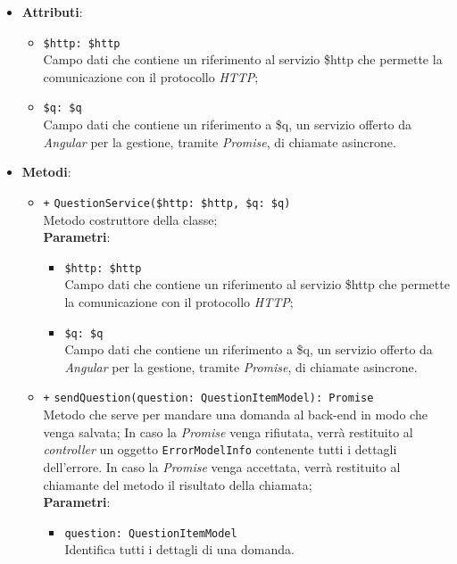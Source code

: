 \begin{itemize}
\begin{itemize}
	\end{itemize}
	\item \textbf{Attributi}:
	\begin{itemize}
		\item \texttt{\$http: \$http} \\ Campo dati che contiene un riferimento al servizio \$http che permette la comunicazione con il protocollo \textit{HTTP};
		\item \texttt{\$q: \$q} \\ Campo dati che contiene un riferimento a \$q, un servizio offerto da \textit{Angular} per la gestione, tramite \textit{Promise}, di chiamate asincrone.
	\end{itemize}
	\item \textbf{Metodi}:
	\begin{itemize}
		\item \texttt{+} \texttt{QuestionService(\$http: \$http, \$q: \$q)} \\ Metodo costruttore della classe; \\
		\textbf{Parametri}:
		\begin{itemize}
			\item \texttt{\$http: \$http} \\ Campo dati che contiene un riferimento al servizio \$http che permette la comunicazione con il protocollo \textit{HTTP};
			\item \texttt{\$q: \$q} \\ Campo dati che contiene un riferimento a \$q, un servizio offerto da \textit{Angular} per la gestione, tramite \textit{Promise}, di chiamate asincrone.
		\end{itemize}
		\item \texttt{+} \texttt{sendQuestion(question: QuestionItemModel): Promise} \\Metodo che serve per mandare una domanda al back-end in modo che venga salvata; In caso la \textit{Promise} venga rifiutata, verrà restituito al \textit{controller} un oggetto \texttt{ErrorModelInfo} contenente tutti i dettagli dell'errore. In caso la \textit{Promise} venga accettata, verrà restituito al chiamante del metodo il risultato della chiamata;\\
		\textbf{Parametri}: 
		\begin{itemize}
			\item \texttt{question: QuestionItemModel} \\ Identifica tutti i dettagli di una domanda.
		\end{itemize}

\end{itemize}
\end{itemize}
